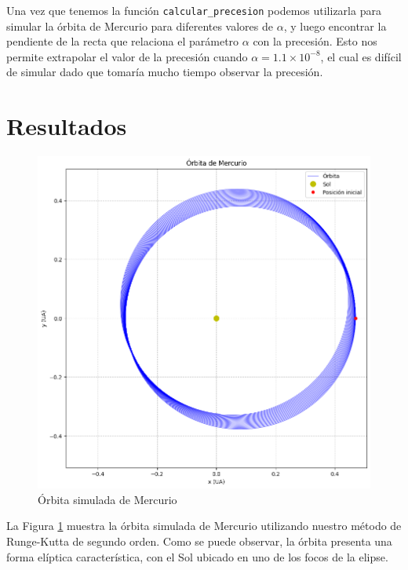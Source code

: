 \documentclass[twocolumn]{article}
\begin{document}
Una vez que tenemos la función \texttt{calcular\_precesion} podemos utilizarla para simular la órbita de Mercurio para diferentes valores de $\alpha$, y luego encontrar la pendiente de la recta que relaciona el parámetro $\alpha$ con la precesión. Esto nos permite extrapolar el valor de la precesión cuando $\alpha = 1.1 \times 10^{-8}$, el cual es difícil de simular dado que tomaría mucho tiempo observar la precesión.


\section{Resultados}

\begin{figure}[H]
\centering
\includegraphics[width=0.9\columnwidth]{./figures/orbita_mercurio.png}
\caption{Órbita simulada de Mercurio}
\label{fig:orbita}
\end{figure}

La Figura \ref{fig:orbita} muestra la órbita simulada de Mercurio utilizando nuestro método de Runge-Kutta de segundo orden. Como se puede observar, la órbita presenta una forma elíptica característica, con el Sol ubicado en uno de los focos de la elipse.
\end{document}
